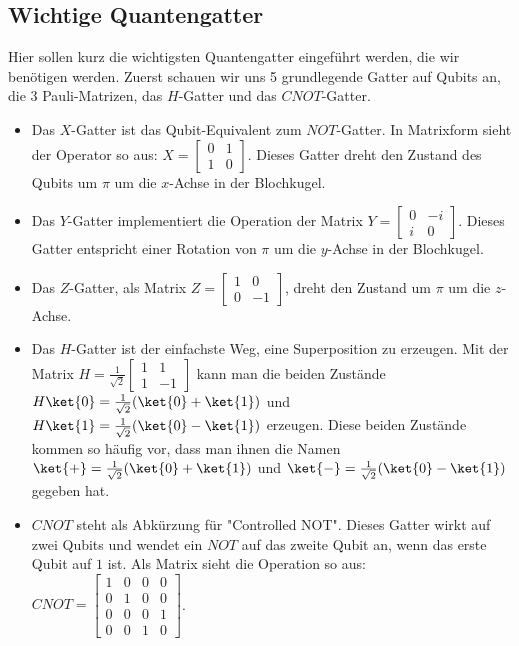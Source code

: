 \subsection{Wichtige Quantengatter}
Hier sollen kurz die wichtigsten Quantengatter eingeführt werden, die wir benötigen werden. Zuerst schauen wir uns 5 grundlegende Gatter auf Qubits an, die 3 Pauli-Matrizen, das $H$-Gatter und das $CNOT$-Gatter.
\begin{itemize}
    \item Das $X$-Gatter ist das Qubit-Equivalent zum $NOT$-Gatter. In Matrixform sieht der Operator so aus: $ X = \begin{bmatrix}0 & 1 \\ 1 & 0\end{bmatrix}$. Dieses Gatter dreht den Zustand des Qubits um $\pi$ um die $x$-Achse in der Blochkugel.
    \item Das $Y$-Gatter implementiert die Operation der Matrix $Y = \begin{bmatrix}0 & -i \\ i & 0\end{bmatrix}$. Dieses Gatter entspricht einer Rotation von $\pi$ um die $y$-Achse in der Blochkugel.
    \item Das $Z$-Gatter, als Matrix $Z = \begin{bmatrix}1 & 0 \\ 0 & -1\end{bmatrix}$, dreht den Zustand um $\pi$ um die $z$-Achse.
    \item Das $H$-Gatter ist der einfachste Weg, eine Superposition zu erzeugen. Mit der Matrix $H = \frac{1}{\sqrt{2}}\begin{bmatrix}1 & 1 \\ 1 & -1\end{bmatrix}$ kann man die beiden Zustände $H\ket{0} = \frac{1}{\sqrt{2}}(\ket{0} + \ket{1})$ und $H\ket{1} = \frac{1}{\sqrt{2}}(\ket{0} - \ket{1})$ erzeugen. Diese beiden Zustände kommen so häufig vor, dass man ihnen die Namen $\ket{+} = \frac{1}{\sqrt{2}}(\ket{0} + \ket{1})$ und $\ket{-} = \frac{1}{\sqrt{2}}(\ket{0} - \ket{1})$ gegeben hat.
    \item $CNOT$ steht als Abkürzung für "Controlled NOT". Dieses Gatter wirkt auf zwei Qubits und wendet ein $NOT$ auf das zweite Qubit an, wenn das erste Qubit auf $1$ ist. Als Matrix sieht die Operation so aus: $CNOT = \begin{bmatrix}1 & 0 & 0 & 0 \\ 0 & 1 & 0 & 0 \\ 0 & 0 & 0 & 1 \\ 0 & 0 & 1 & 0\end{bmatrix}$.
\end{itemize}

